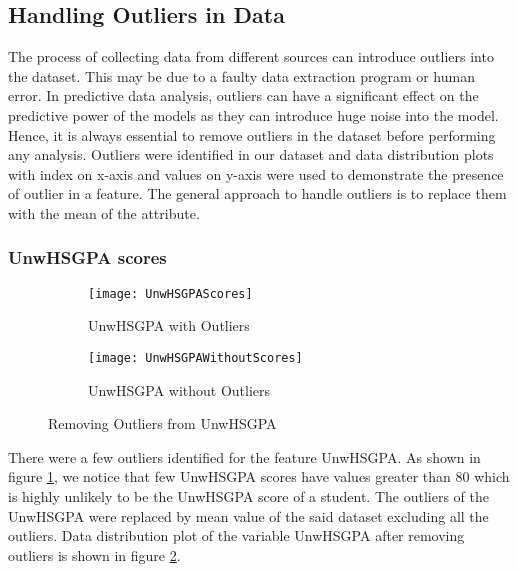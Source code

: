 \documentclass[11pt,openright]{report}
\begin{document}
\subsection {Handling Outliers in Data}

The process of collecting data from different sources can introduce outliers into the dataset. This may be due to a faulty data extraction program or human error. In predictive data analysis, outliers can have a significant effect on the predictive power of the models as they can introduce huge noise into the model. Hence, it is always essential to remove outliers in the dataset before performing any analysis. Outliers were identified in our dataset and data distribution plots with index on x-axis and values on y-axis were used to demonstrate the presence of outlier in a feature. The general approach to handle outliers is to replace them with the mean of the attribute.


\subsubsection{UnwHSGPA scores}

\begin{figure}
\centering
    \begin{subfigure}[b]{0.55\textwidth}            
            \texttt{[image: UnwHSGPAScores]}
            \caption{UnwHSGPA with Outliers}
            \label{fig:UnwHSGPA-with-outliers}
    \end{subfigure}%
    \begin{subfigure}[b]{0.55\textwidth}
            \centering
            \texttt{[image: UnwHSGPAWithoutScores]}
            \caption{UnwHSGPA without Outliers}
            \label{fig:UnwHSGPA-No-outliers}
    \end{subfigure}
    \caption{Removing Outliers from UnwHSGPA}\label{fig:unwHSGPA}
\end{figure}

 There were a few outliers identified for the feature UnwHSGPA. As shown in figure \ref{fig:UnwHSGPA-with-outliers}, we notice that few UnwHSGPA scores have values greater than 80 which is highly unlikely to be the UnwHSGPA score of a student. The outliers of the UnwHSGPA were replaced by mean value of the said dataset excluding all the outliers. Data distribution plot of the variable UnwHSGPA after removing outliers is shown in figure \ref{fig:UnwHSGPA-No-outliers}.
\end{document}
